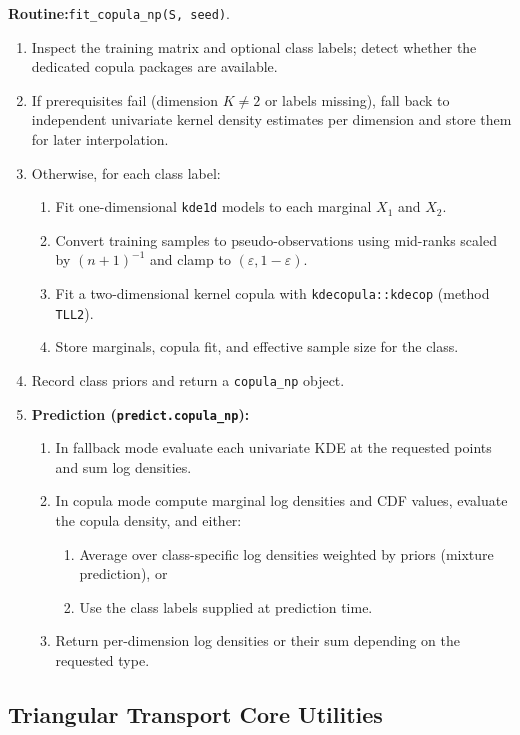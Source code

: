 \documentclass[11pt,a4paper,twoside]{book}\usepackage[]{graphicx}\usepackage[]{xcolor}
\begin{document}
\textbf{Routine:}\quad\texttt{fit\_copula\_np(S, seed)}.

\begin{enumerate}
 \item Inspect the training matrix and optional class labels; detect whether the dedicated copula packages are available.
 \item If prerequisites fail (dimension $K \neq 2$ or labels missing), fall back to independent univariate kernel density estimates per dimension and store them for later interpolation.
 \item Otherwise, for each class label:
 \begin{enumerate}
 \item Fit one-dimensional \texttt{kde1d} models to each marginal $X_1$ and $X_2$.
 \item Convert training samples to pseudo-observations using mid-ranks scaled by $(n+1)^{-1}$ and clamp to $(\varepsilon, 1-\varepsilon)$.
 \item Fit a two-dimensional kernel copula with \texttt{kdecopula::kdecop} (method \texttt{TLL2}).
 \item Store marginals, copula fit, and effective sample size for the class.
 \end{enumerate}
 \item Record class priors and return a \texttt{copula\_np} object.

 \item \textbf{Prediction (\texttt{predict.copula\_np}):}
 \begin{enumerate}
 \item In fallback mode evaluate each univariate KDE at the requested points and sum log densities.
 \item In copula mode compute marginal log densities and CDF values, evaluate the copula density, and either:
 \begin{enumerate}
 \item Average over class-specific log densities weighted by priors (mixture prediction), or
 \item Use the class labels supplied at prediction time.
 \end{enumerate}
 \item Return per-dimension log densities or their sum depending on the requested type.
 \end{enumerate}
\end{enumerate}

\subsection{Triangular Transport Core Utilities}\label{app:ttm-core}
\end{document}
